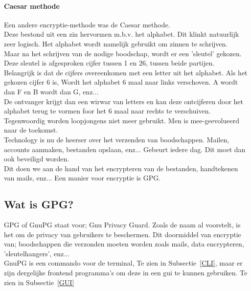 \documentclass[12pt]{article}
\begin{document}
			\paragraph{Caesar methode}
				Een andere encryptie-methode was de Caesar methode.\\
				Deze bestond uit een zin hervormen m.b.v. het alphabet. Dit klinkt natuurlijk zeer 						logisch.
				Het alphabet wordt namelijk gebruikt om zinnen te schrijven.\\
				Maar na het schrijven van de nodige boodschap, wordt er een 'sleutel' gekozen. Deze 					sleutel is afgesproken cijfer tussen 1 en 26, tussen beide partijen.\\
				Belangrijk is dat de cijfers overeenkomen met een letter uit het alphabet. Als het 						gekozen cijfer 6 is, Wordt het alphabet 6 maal naar links verschoven. A wordt dan F 					en B wordt dan G, enz...\\
				De ontvanger krijgt dan een wirwar van letters en kan deze ontcijferen door het 						alphabet terug te vormen foor het 6 maal naar rechts te verschuiven.\\


				Tegenwoordig worden loopjongens niet meer gebruikt. Men is mee-geevolueerd naar de 						toekomst.\\
				Technology is nu de heerser over het verzenden van boodschappen.
				Mailen, accounts aanmaken, bestanden opslaan, enz... Gebeurt iedere dag. Dit moet dan 					ook beveiligd worden.\\
				Dit doen we aan de hand van het encrypteren van de bestanden, handtekenen van mails,
				enz...
				Een manier voor encryptie is GPG.

			\newpage
			\subsection{Wat is GPG?}
				GPG of GnuPG staat voor; Gnu Privacy Guard. Zoals de naam al voorstelt, is het om de 					privacy van gebruikers te beschermen. Dit doormiddel van encryptie van; boodschappen 					die verzonden moeten worden zoals mails, data encrypteren, 'sleutelhangers', enz... 					\\
				GnuPG is een commando voor de terminal, Te zien in Subsectie~\ref{CLI}, maar er zijn 					dergelijke frontend programma's om deze in een gui te kunnen gebruiken. Te zien in 						Subsectie~\ref{GUI}
\end{document}
